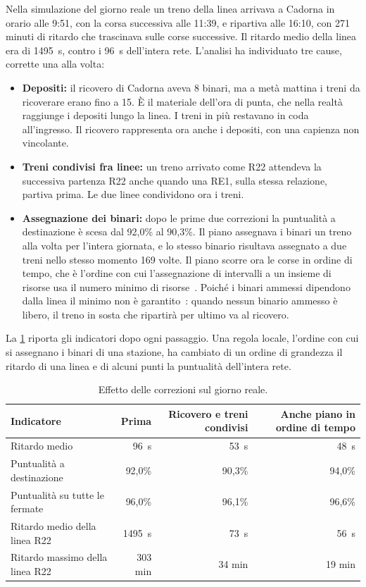 Nella simulazione del giorno reale un treno della linea arrivava a Cadorna in orario alle 9:51, con la corsa successiva alle 11:39, e ripartiva alle 16:10, con 271 minuti di ritardo che trascinava sulle corse successive. Il ritardo medio della linea era di \SI{1495}{\second}, contro i \SI{96}{\second} dell'intera rete. L'analisi ha individuato tre cause, corrette una alla volta:
\begin{itemize}
	\item \textbf{Depositi:} il ricovero di Cadorna aveva 8 binari, ma a metà mattina i treni da ricoverare erano fino a 15. È il materiale dell'ora di punta, che nella realtà raggiunge i depositi lungo la linea. I treni in più restavano in coda all'ingresso. Il ricovero rappresenta ora anche i depositi, con una capienza non vincolante.
	\item \textbf{Treni condivisi fra linee:} un treno arrivato come R22 attendeva la successiva partenza R22 anche quando una RE1, sulla stessa relazione, partiva prima. Le due linee condividono ora i treni.
	\item \textbf{Assegnazione dei binari:} dopo le prime due correzioni la puntualità a destinazione è scesa dal 92,0\% al 90,3\%. Il piano assegnava i binari un treno alla volta per l'intera giornata, e lo stesso binario risultava assegnato a due treni nello stesso momento 169 volte. Il piano scorre ora le corse in ordine di tempo, che è l'ordine con cui l'assegnazione di intervalli a un insieme di risorse usa il numero minimo di risorse~\cite{kleinberg2005algorithm}. Poiché i binari ammessi dipendono dalla linea il minimo non è garantito~\cite{caprara2011platforming}: quando nessun binario ammesso è libero, il treno in sosta che ripartirà per ultimo va al ricovero.
\end{itemize}

La \cref{tab:orari-r22} riporta gli indicatori dopo ogni passaggio. Una regola locale, l'ordine con cui si assegnano i binari di una stazione, ha cambiato di un ordine di grandezza il ritardo di una linea e di alcuni punti la puntualità dell'intera rete.

\begin{table}[H]
	\centering
	\caption{Effetto delle correzioni sul giorno reale.}
	\label{tab:orari-r22}
	\begin{tabularx}{\textwidth}{Xrrr}
		\toprule
		Indicatore & Prima & Ricovero e treni condivisi & Anche piano in ordine di tempo \\
		\midrule
		Ritardo medio & \SI{96}{\second} & \SI{53}{\second} & \SI{48}{\second} \\
		Puntualità a destinazione & 92,0\% & 90,3\% & 94,0\% \\
		Puntualità su tutte le fermate & 96,0\% & 96,1\% & 96,6\% \\
		Ritardo medio della linea R22 & \SI{1495}{\second} & \SI{73}{\second} & \SI{56}{\second} \\
		Ritardo massimo della linea R22 & 303 min & 34 min & 19 min \\
		\bottomrule
	\end{tabularx}
\end{table}

